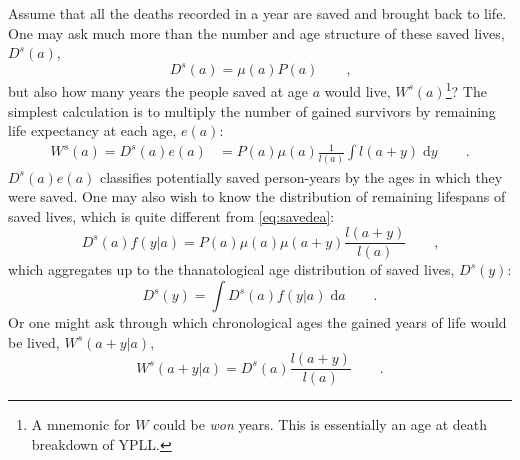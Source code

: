\documentclass{article}
\newcommand{\dd}{\; \mathrm{d}}
\newcommand{\tc}{\quad\quad\text{,}}
\newcommand{\tp}{\quad\quad\text{.}}
\begin{document}
Assume that all the deaths recorded in a year are saved and brought back to
life. One may ask much more than the number and age structure of these saved
lives, $D^s(a)$,
\begin{equation}
\label{eq:Dsa}
D^s(a) = \mu(a)P(a) \tc
\end{equation}
but also how many years the people saved at age $a$ would live, 
$W^s(a)$\footnote{A mnemonic for $W$ could be \textit{won} years. This is
essentially an age at death breakdown of YPLL.}? The simplest calculation is
to multiply the number of gained survivors by remaining life expectancy at each
age, $e(a)$:
\begin{align}
\label{eq:savedea}
W^s(a) = D^s(a)e(a) &= P(a)\mu(a)\frac{1}{l(a)}\int l(a+y) \dd y \tp
\end{align}
$D^s(a)e(a)$ classifies potentially saved person-years by the
ages in which they were saved. One may also wish to know the distribution of remaining lifespans of saved
lives, which is quite different from \eqref{eq:savedea}:
\begin{equation}
\label{eq:savedya}
D^s(a)f(y|a) = P(a)\mu(a)\mu(a+y) \frac{l(a+y)}{l(a)} \tc
\end{equation}
which aggregates up to the thanatological age distribution of saved lives,
$D^s(y)$:
\begin{equation}
\label{eq:savedy}
D^s(y) = \int D^s(a)f(y|a) \dd a \tp
\end{equation}
Or one might ask through which chronological ages the gained years of life
would be lived, $W^s(a+y|a)$,
\begin{equation}
\label{eq:gaineday}
W^s(a+y|a) = D^s(a)\frac{l(a+y)}{l(a)} \tp
\end{equation}
\end{document}
